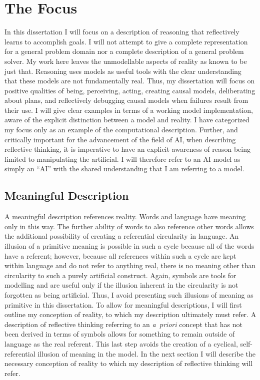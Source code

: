 \chapter{The Focus}
\label{chapter:the_focus}

In this dissertation I will focus on a description of reasoning that
reflectively learns to accomplish goals.  I will not attempt to give a
complete representation for a general problem domain nor a complete
description of a general problem solver.  My work here leaves the
unmodellable aspects of reality as known to be just that.  Reasoning
uses models as useful tools with the clear understanding that these
models are not fundamentally real.  Thus, my dissertation will focus
on positive qualities of being, perceiving, acting, creating causal
models, deliberating about plans, and reflectively debugging causal
models when failures result from their use.  I will give clear
examples in terms of a working model implementation, aware of the
explicit distinction between a model and reality.  I have categorized
my focus only as an example of the computational description.
Further, and critically important for the advancement of the field of
AI, when describing reflective thinking, it is imperative to have an
explicit awareness of reason being limited to manipulating the
artificial.  I will therefore refer to an AI model as simply an ``AI''
with the shared understanding that I am referring to a model.

\section{Meaningful Description}

A meaningful description references reality.  Words and language have
meaning only in this way.  The further ability of words to also
reference other words allows the additional possibility of creating a
referential circularity in language.  An illusion of a primitive
meaning is possible in such a cycle because all of the words have a
referent; however, because all references within such a cycle are kept
within language and do not refer to anything real, there is no meaning
other than circularity to such a purely artificial construct.  Again,
symbols are tools for modelling and are useful only if the illusion
inherent in the circularity is not forgotten as being artificial.
Thus, I avoid presenting such illusions of meaning as primitive in
this dissertation.  To allow for meaningful descriptions, I will first
outline my conception of reality, to which my description ultimately
must refer.  A description of reflective thinking referring to an
\emph{a~priori} concept that has not been derived in terms of symbols
allows for something to remain outside of language as the real
referent.  This last step avoids the creation of a cyclical,
self-referential illusion of meaning in the model.  In the next
section I will describe the necessary conception of reality to which
my description of reflective thinking will refer.

